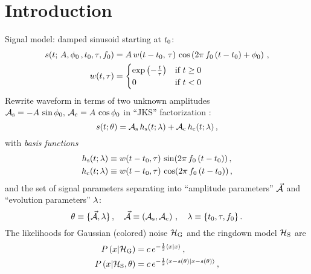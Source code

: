 \documentclass[aps,prd,onecolumn,notitlepage,nofootinbib,superscriptaddress,altaffilletter,floatfix]{revtex4-1}
\begin{document}
\maketitle

\section{Introduction}
\label{Intro}

Signal model: damped sinusoid starting at $t_0$:
\begin{align}
  \label{eq:1}
  s(t;\,A, \phi_0\,, t_0, \tau, f_0) &= A\,w(t-t_0,\,\tau)\,\cos\left(2\pi\,f_0\,(t-t_0) + \phi_0\right)\,,\\
  w(t, \tau) &=
  \begin{cases}
    \exp\left( -\frac{t}{\tau} \right) & \text{if } t \ge 0\,\\
    0  & \text{if } t < 0
  \end{cases}
\end{align}
Rewrite waveform in terms of two unknown amplitudes $\mathcal{A}_{\mathrm{s}} = -A\,\sin\phi_0,\,\mathcal{A}_{\mathrm{c}} = A\,\cos\phi_0$ in ``JKS'' factorization
\cite{bretthorst1988:_bayesian_spectrum,jks98:_data}:
\begin{equation}
  \label{eq:2}
  s(t; \theta) = \mathcal{A}_{\mathrm{s}} \, h_\mathrm{s}(t;\lambda) + \mathcal{A}_{\mathrm{c}}\,h_\mathrm{c}(t;\lambda)\,,
\end{equation}
with \emph{basis functions}
\begin{align}
  \label{eq:14}
  h_\mathrm{s}(t;\lambda) &\equiv w(t-t_0,\tau)\,\sin(2\pi \,f_0\,(t-t_0))\,,\\
  h_\mathrm{c}(t;\lambda) &\equiv w(t-t_0,\tau)\,\cos(2\pi \,f_0\,(t-t_0))\,,
\end{align}
and the set of signal parameters separating into ``amplitude parameters'' $\vec{\mathcal{A}}$ and ``evolution parameters'' $\lambda$:
\begin{equation}
  \label{eq:11}
  \theta \equiv \{\vec{\mathcal{A}}, \lambda\}\,,
  \quad \vec{\mathcal{A}} \equiv \left(\mathcal{A}_{\mathrm{s}},\mathcal{A}_{\mathrm{c}}\right)\,,
  \quad \lambda \equiv \{t_0,\tau, f_0\}\,.
\end{equation}
The likelihoods for Gaussian (colored) noise $\mathcal{H}_{\mathrm{G}}$ and the ringdown model $\mathcal{H}_{\mathrm{S}}$ are
\begin{align}
  \label{eq:4}
  P\left(x|\mathcal{H}_{\mathrm{G}}\right) &= c\,e^{-\frac{1}{2}\langle x|x\rangle}\,,\\
  P\left(x|\mathcal{H}_{\mathrm{S}},\theta\right) &= c\,e^{-\frac{1}{2}\langle x-s(\theta)|x-s(\theta)\rangle}\,,
\end{align}
\end{document}
